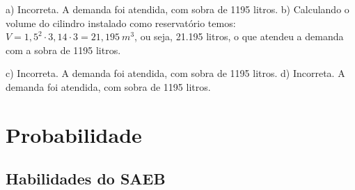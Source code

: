 \begin{escolha}
\begin{boxmedio}
\begin{boxmedio}
{\begin{boxpeq}
\begin{boxpeq}
{\begin{boxpeq}
\begin{boxmedio}
\begin{boxmedio}
\begin{boxpeq}
\begin{boxmedio}
\begin{boxpeq}
\begin{boxpeq}
\begin{boxpeq}
\begin{boxpeq}
\begin{boxmedio}
{\begin{boxmedio}
\begin{boxmedio}
\begin{boxpeq}
\begin{boxmedio}
\begin{boxpeq}
\begin{boxpeq}
\begin{boxpeq}
\begin{escolha}
{\begin{boxmedio}
\begin{boxpeq}
\begin{boxpeq}
\begin{boxpeq}
\begin{boxpeq}
\begin{boxpeq}
\begin{boxmedio}
\begin{boxpeq}
\begin{boxpeq}
\begin{boxpeq}
{\begin{boxpeq}
\begin{boxmedio}
\begin{boxpeq}
\begin{boxpeq}
\begin{boxpeq}
{\begin{boxpeq}
\begin{boxmedio}
{\begin{boxpeq}
\begin{boxpeq}
\begin{boxmedio}
\begin{boxmedio}
\begin{boxpeq}
\begin{boxpeq}
{\begin{boxpeq}
\begin{boxpeq}
\begin{boxpeq}
\begin{boxpeq}
\begin{boxpeq}
\begin{escolha}
\begin{escolha}
{\begin{boxmedio}
\begin{boxpeq}
\begin{q°}
\begin{boxmedio}
\begin{boxpeq}
\begin{boxpeq}
\begin{boxmedio}
\begin{boxmedio}
\begin{boxmedio}
\begin{boxmedio}
{\begin{enumerate}
\begin{boxpeq}
{\begin{boxpeq}
\begin{boxpeq}
\begin{boxmedio}
\begin{boxpeq}
\begin{boxpeq}
\begin{boxpeq}
{\begin{boxpeq}
\begin{boxmedio}
\begin{boxpeq}
{a) Incorreta. A demanda foi atendida, com sobra de 1195 litros.
b) Calculando o volume do cilindro instalado como reservatório temos:
$V = {1,5}^{2} \cdot 3,14 \cdot 3 = 21,195\ m^3$, ou seja, 21.195
litros, o que atendeu a demanda com a sobra de 1195 litros. 

c) Incorreta. A demanda foi atendida, com sobra de 1195 litros.
d) Incorreta. A demanda foi atendida, com sobra de 1195 litros.}

\chapter{Probabilidade}

\section{Habilidades do SAEB}

\begin{itemize}


\end{itemize}
\end{boxpeq}
\end{boxmedio}
\end{boxpeq}}
\end{boxpeq}
\end{boxpeq}
\end{boxpeq}
\end{boxmedio}
\end{boxpeq}
\end{boxpeq}}
\end{boxpeq}
\end{enumerate}}
\end{boxmedio}
\end{boxmedio}
\end{boxmedio}
\end{boxmedio}
\end{boxpeq}
\end{boxpeq}
\end{boxmedio}
\end{q°}
\end{boxpeq}
\end{boxmedio}}
\end{escolha}
\end{escolha}
\end{boxpeq}
\end{boxpeq}
\end{boxpeq}
\end{boxpeq}
\end{boxpeq}}
\end{boxpeq}
\end{boxpeq}
\end{boxmedio}
\end{boxmedio}
\end{boxpeq}
\end{boxpeq}}
\end{boxmedio}
\end{boxpeq}}
\end{boxpeq}
\end{boxpeq}
\end{boxpeq}
\end{boxmedio}
\end{boxpeq}}
\end{boxpeq}
\end{boxpeq}
\end{boxpeq}
\end{boxmedio}
\end{boxpeq}
\end{boxpeq}
\end{boxpeq}
\end{boxpeq}
\end{boxpeq}
\end{boxmedio}}
\end{escolha}
\end{boxpeq}
\end{boxpeq}
\end{boxpeq}
\end{boxmedio}
\end{boxpeq}
\end{boxmedio}
\end{boxmedio}}
\end{boxmedio}
\end{boxpeq}
\end{boxpeq}
\end{boxpeq}
\end{boxpeq}
\end{boxmedio}
\end{boxpeq}
\end{boxmedio}
\end{boxmedio}
\end{boxpeq}}
\end{boxpeq}
\end{boxpeq}}
\end{boxmedio}
\end{boxmedio}
\end{escolha}
